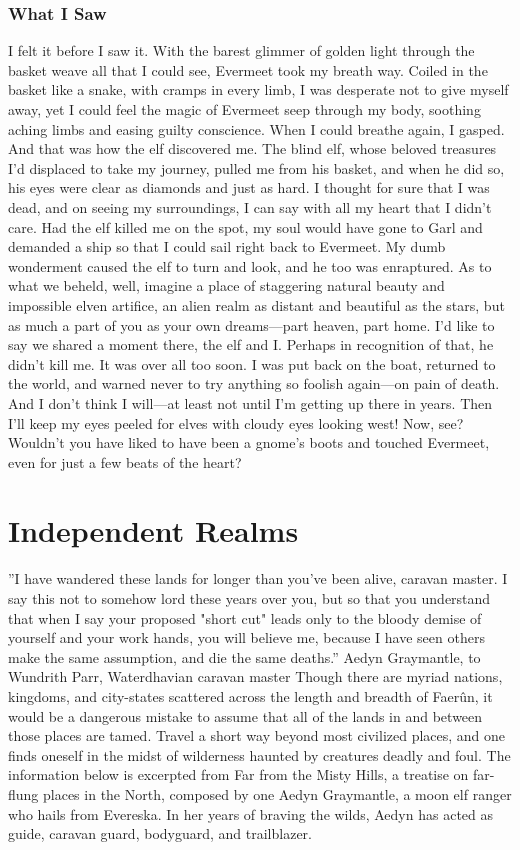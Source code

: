 \documentclass[10pt,a4paper,twoside,twocolumn,openany,bg=print,nodeprecatedcode]{dndbook}
\begin{document}
\subsubsection{What I Saw}
I felt it before I saw it. With the barest glimmer of golden light through the basket weave all that I could see, Evermeet took my breath way. Coiled in the basket like a snake, with cramps in every limb, I was desperate not to give myself away, yet I could feel the magic of Evermeet seep through my body, soothing aching limbs and easing guilty conscience. When I could breathe again, I gasped. And that was how the elf discovered me.
The blind elf, whose beloved treasures I'd displaced to take my journey, pulled me from his basket, and when he did so, his eyes were clear as diamonds and just as hard. I thought for sure that I was dead, and on seeing my surroundings, I can say with all my heart that I didn't care. Had the elf killed me on the spot, my soul would have gone to Garl and demanded a ship so that I could sail right back to Evermeet. My dumb wonderment caused the elf to turn and look, and he too was enraptured.
As to what we beheld, well, imagine a place of staggering natural beauty and impossible elven artifice, an alien realm as distant and beautiful as the stars, but as much a part of you as your own dreams—part heaven, part home.
I'd like to say we shared a moment there, the elf and I. Perhaps in recognition of that, he didn't kill me.
It was over all too soon. I was put back on the boat, returned to the world, and warned never to try anything so foolish again—on pain of death. And I don't think I will—at least not until I'm getting up there in years. Then I'll keep my eyes peeled for elves with cloudy eyes looking west!
Now, see? Wouldn't you have liked to have been a gnome's boots and touched Evermeet, even for just a few beats of the heart?
\section{Independent Realms}
\DndQuote%
{}
{''I have wandered these lands for longer than you've been alive, caravan master. I say this not to somehow lord these years over you, but so that you understand that when I say your proposed "short cut" leads only to the bloody demise of yourself and your work hands, you will believe me, because I have seen others make the same assumption, and die the same deaths.''}
{Aedyn Graymantle, to Wundrith Parr, Waterdhavian caravan master}
Though there are myriad nations, kingdoms, and city-states scattered across the length and breadth of Faerûn, it would be a dangerous mistake to assume that all of the lands in and between those places are tamed. Travel a short way beyond most civilized places, and one finds oneself in the midst of wilderness haunted by creatures deadly and foul.
The information below is excerpted from Far from the Misty Hills, a treatise on far-flung places in the North, composed by one Aedyn Graymantle, a moon elf ranger who hails from Evereska. In her years of braving the wilds, Aedyn has acted as guide, caravan guard, bodyguard, and trailblazer.
\end{document}

